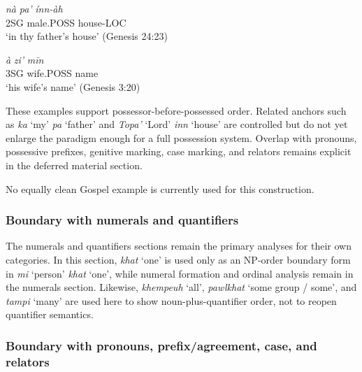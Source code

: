 \documentclass[
  11pt,
  a4paper,
]{article}
\newcommand{\tdim}[1]{\textit{#1}}
\newcommand{\tdimword}[1]{\textit{#1}}
\renewcommand{\textsc}[1]{{\footnotesize\MakeUppercase{#1}}}
\newcommand{\glossquote}[1]{`#1'}
\begin{document}
\begin{exe}
\ex \label{ex:np-poss-na-pa-inn}
\gll \tdimword{nà} \tdimword{pa'} \tdimword{ínn-àh} \\
     \textsc{2sg} male.\textsc{poss} house-\textsc{loc} \\
\glt \glossquote{in thy father's house} (Genesis 24:23)
\end{exe}

\begin{exe}
\ex \label{ex:np-poss-a-zi-min}
\gll \tdimword{à} \tdimword{zi'} \tdimword{mīn} \\
     \textsc{3sg} wife.\textsc{poss} name \\
\glt \glossquote{his wife's name} (Genesis 3:20)
\end{exe}

These examples support possessor-before-possessed order. Related anchors
such as \tdim{ka} \glossquote{my} \tdim{pa} \glossquote{father} and
\tdim{Topa'} \glossquote{Lord} \tdim{inn} \glossquote{house} are
controlled but do not yet enlarge the paradigm enough for a full
possession system. Overlap with pronouns, possessive prefixes, genitive
marking, case marking, and relators remains explicit in the deferred
material section.

No equally clean Gospel example is currently used for this construction.

\subsubsection{Boundary with numerals and
quantifiers}\label{boundary-with-numerals-and-quantifiers}

The numerals and quantifiers sections remain the primary analyses for
their own categories. In this section, \tdim{khat} \glossquote{one} is
used only as an NP-order boundary form in \tdim{mi} \glossquote{person}
\tdim{khat} \glossquote{one}, while numeral formation and ordinal
analysis remain in the numerals section. Likewise, \tdim{khempeuh}
\glossquote{all}, \tdim{pawlkhat} \glossquote{some group / some}, and
\tdim{tampi} \glossquote{many} are used here to show
noun-plus-quantifier order, not to reopen quantifier semantics.

\subsubsection{Boundary with pronouns, prefix/agreement, case, and
relators}\label{boundary-with-pronouns-prefixagreement-case-and-relators}
\end{document}

